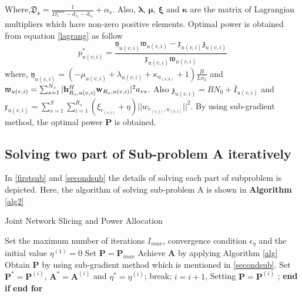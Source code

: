 \documentclass[conference]{IEEEtran}
\begin{document}
Where,$\mathfrak{D_s}=\frac{1}{D_{s}^{max}-d_{s_1}-d_{s_2}}+\alpha_s$. Also, $\boldsymbol{\lambda}$, $\boldsymbol{\mu}$, $\boldsymbol{\xi}$ and $\boldsymbol{ \kappa}$ are the matrix of Lagrangian multipliers which have non-zero positive elements. Optimal power is obtained from equation \eqref{lagrang} as follow
\begin{equation}
p_{u(v,i)}^{*} = \frac{\mathfrak{y}_{u(v,i)}\mathfrak{w}_{u(v,i)}-\mathfrak{x}_{u(v,i)}\mathfrak{z}_{u(v,i)}}{\mathfrak{x}_{u(v,i)}\mathfrak{w}_{u(v,i)} }
\end{equation}
where, $\mathfrak{y}_{u(v,i)}= (-\mu_{u(v,i)}+\lambda_{u(v,i)}+\kappa_{u_{(v,k)}}+1)\frac{B}{Ln_2}$ and 
$\mathfrak{w}_{u(v,i)} = \sum_{s=1}^{N_s}|\bold{h}_{R_s,u(v,i)}^H \bold{w}_{R_s,u(v,i)}|^2 a_{vs}$. Also 
$\mathfrak{z}_{u(v,i)} = BN_0 + \bar{I}_{u(v,i)}$ and $\mathfrak{x}_{u(v,i)} = \sum\limits_{s=1}^{S} \sum\limits_{i=1}^{R_s} (\xi_{r_{(s,i)}}+\eta)||w_{r_{(s,j)},u_{(v,i)}}||^2$. 
By using sub-gradient method, the optimal power $\boldsymbol{P}$ is obtained. 
\subsection{Solving two part of Sub-problem A iteratively}
In \eqref{firstsub} and \eqref{secondsub} the details of solving each part of subproblem is depicted. 
Here, the algorithm of solving sub-problem A is shown in \textbf{Algorithm} \eqref{alg2}
\begin{algorithm}
\caption{Joint Network Slicing and Power Allocation}\label{alg2}
\begin{algorithmic}[1]
\State Set the maximum number of iterations $I_{max}$, convergence condition $\epsilon_{\eta}$  and the initial value $\eta^{(1)} = 0$
\State Set $\boldsymbol{P} = \boldsymbol{P}_{max}$
\State Achieve $\boldsymbol{A}$ by applying Algorithm \eqref{alg}
\State Obtain $\boldsymbol{P}$ by using sub-gradient method which is mentioned in \eqref{secondsub}.
\State Set $\boldsymbol{P}^*= \boldsymbol{P}^{(i)} $, $\boldsymbol{A}^*= \boldsymbol{A}^{(i)} $   and  $ \eta^{*} =\eta^{(i)} $;
\State break;
\Else
\State $i= i+1$, Setting $\boldsymbol{P} = \boldsymbol{P}^{(i)}$ ;
\EndIf 
\State \textbf{end if}
\EndFor 
\State \textbf{end for}
\end{algorithmic}
\end{algorithm}
\end{document}
